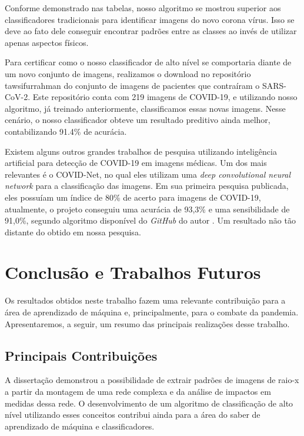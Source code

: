 \documentclass[
12pt,        %
oneside,     %
a4paper,     %
english,       %
brazil        %
%
%
]{ppgca}
\begin{document}
Conforme demonstrado nas tabelas, nosso algoritmo se mostrou superior aos classificadores tradicionais para identificar imagens do novo corona vírus. Isso se deve ao fato dele conseguir encontrar padrões entre as classes ao invés de utilizar apenas aspectos físicos.

Para certificar como o nosso classificador de alto nível se comportaria diante de um novo conjunto de imagens, realizamos o download no repositório tawsifurrahman \cite{repo5} do conjunto de imagens de pacientes que contraíram o SARS-CoV-2. Este repositório conta com 219 imagens de COVID-19, e utilizando nosso algoritmo, já treinado anteriormente, classificamos essas novas imagens. Nesse cenário, o nosso classificador obteve um resultado preditivo ainda melhor, contabilizando 91.4\% de acurácia.

Existem alguns outros grandes trabalhos de pesquisa utilizando inteligência artificial para detecção de COVID-19 em imagens médicas. Um dos mais relevantes é o COVID-Net, no qual eles utilizam uma \textit{deep convolutional neural network} para a classificação das imagens. Em sua primeira pesquisa publicada, eles possuíam um índice de 80\% de acerto para imagens de COVID-19, atualmente, o projeto conseguiu uma acurácia de 93,3\% e uma sensibilidade de 91,0\%\cite{wang2020covidnet}, segundo algoritmo disponível do \textit{GitHub} do autor \cite{covidnet}. Um resultado não tão distante do obtido em nossa pesquisa.



\chapter{Conclusão e Trabalhos Futuros}

Os resultados obtidos neste trabalho fazem uma relevante contribuição para a área de aprendizado de máquina e, principalmente, para o combate da pandemia. Apresentaremos, a seguir, um resumo das principais realizações desse trabalho.

\section{Principais Contribuições}

A dissertação demonstrou a possibilidade de extrair padrões de imagens de raio-x a partir da montagem de uma rede complexa e da análise de impactos em medidas dessa rede. O desenvolvimento de um algoritmo de classificação de alto nível utilizando esses conceitos contribui ainda para a área do saber de aprendizado de máquina e classificadores. 
\end{document}
